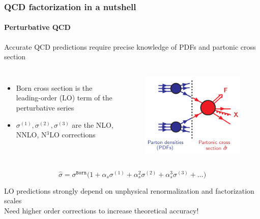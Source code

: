 \documentclass[aspectratio=43]{beamer}
\begin{document}
\begin{frame}

	\frametitle{QCD factorization in a nutshell}
	\framesubtitle{Perturbative QCD}
	
	\footnotesize Accurate QCD predictions require precise knowledge of {\color{blue}PDFs} and {\color{red} partonic cross section}
	\begin{columns}
		
		
		\begin{itemize}
			\item \footnotesize Born cross section is the leading-order (LO) term of the perturbative series
			\item \footnotesize $\sigma^{(1)}, \sigma^{(2)}, \sigma^{(3)}$ are the NLO, NNLO, N$^{3}$LO corrections
		\end{itemize}
		
		\begin{figure}[!htb]
			\includegraphics[width = 4 cm]{plots/section1/factorization_3.png}
		\end{figure}
	
	\end{columns}

	\vspace{0.5cm}	
	
	\begin{equation}
		\hat{\sigma} = \sigma^{\texttt{Born}} \Big( 1 +
		\alpha_{s} \sigma^{(1)} + 
		\alpha_{s}^{2} \sigma^{(2)} + 
		\alpha_{s}^{3} \sigma^{(3)} + ... \Big) \nonumber
	\end{equation}
	
	\footnotesize LO predictions strongly depend on unphysical renormalization and factorization scales \\
	{\color{red}Need higher order corrections to increase theoretical accuracy!}

\end{frame}

\begin{frame}


\end{frame}
\end{document}
